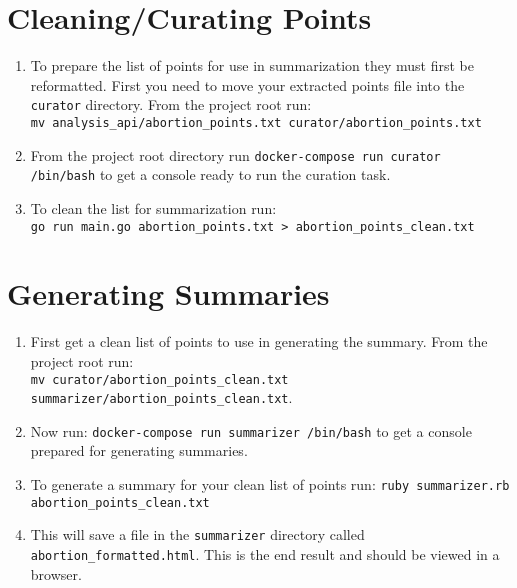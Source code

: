 \section{Cleaning/Curating Points}
\begin{enumerate}
	\item{To prepare the list of points for use in summarization they must first be reformatted. First you need to move your extracted points file into the \texttt{curator} directory. From the project root run: \\ \texttt{mv analysis\_api/abortion\_points.txt curator/abortion\_points.txt}}
	\item{From the project root directory run \texttt{docker-compose run curator /bin/bash} to get a console ready to run the curation task.}
	\item{To clean the list for summarization run: \\ \texttt{go run main.go abortion\_points.txt > abortion\_points\_clean.txt}}
\end{enumerate}

\section{Generating Summaries}
\begin{enumerate}
	\item{First get a clean list of points to use in generating the summary. From the project root run: \\ \texttt{mv curator/abortion\_points\_clean.txt summarizer/abortion\_points\_clean.txt}.}
	\item{Now run: \texttt{docker-compose run summarizer /bin/bash} to get a console prepared for generating summaries.}
	\item{To generate a summary for your clean list of points run: \texttt{ruby summarizer.rb abortion\_points\_clean.txt}}
	\item{This will save a file in the \texttt{summarizer} directory called \texttt{abortion\_formatted.html}. This is the end result and should be viewed in a browser.}
\end{enumerate}


